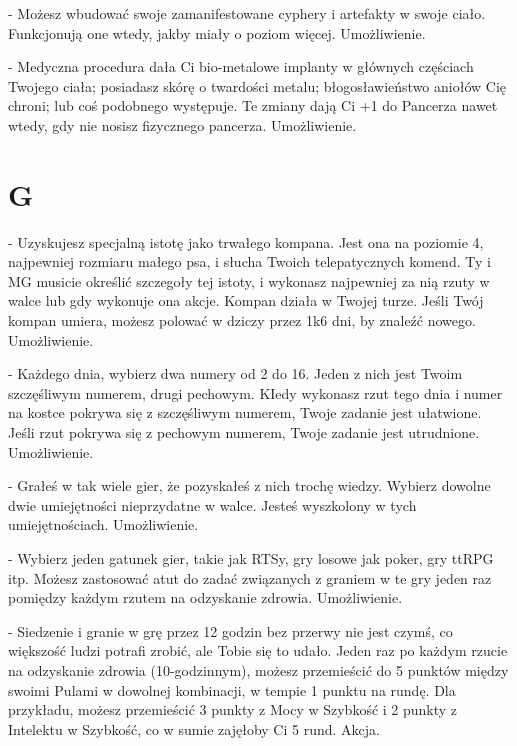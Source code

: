 { - Możesz wbudować swoje zamanifestowane cyphery i artefakty w swoje ciało. Funkcjonują one wtedy, jakby miały o poziom więcej. Umożliwienie.

 - Medyczna procedura dała Ci bio-metalowe implanty w głównych częściach Twojego ciała; posiadasz skórę o twardości metalu; błogosławieństwo aniołów Cię chroni; lub coś podobnego występuje. Te zmiany dają Ci +1 do Pancerza nawet wtedy, gdy nie nosisz fizycznego pancerza. Umożliwienie. 

\section{G}

 - Uzyskujesz specjalną istotę jako trwałego kompana. Jest ona na poziomie 4, najpewniej rozmiaru małego psa, i słucha Twoich telepatycznych komend. Ty i MG musicie określić szczegoły tej istoty, i wykonasz najpewniej za nią rzuty w walce lub gdy wykonuje ona akcje. Kompan działa w Twojej turze. Jeśli Twój kompan umiera, możesz polować w dziczy przez 1k6 dni, by znaleźć nowego. Umożliwienie.

 - Każdego dnia, wybierz dwa numery od 2 do 16. Jeden z nich jest Twoim szczęśliwym numerem, drugi pechowym. KIedy wykonasz rzut tego dnia i numer na kostce pokrywa się z szczęśliwym numerem, Twoje zadanie jest ułatwione. Jeśli rzut pokrywa się z  pechowym numerem, Twoje zadanie jest utrudnione. Umożliwienie.

 - Grałeś w tak wiele gier, że pozyskałeś z nich trochę wiedzy. Wybierz dowolne dwie umiejętności nieprzydatne w walce. Jesteś wyszkolony w tych umiejętnościach. Umożliwienie.

 - Wybierz jeden gatunek gier, takie jak RTSy, gry losowe jak poker, gry ttRPG itp. Możesz zastosować atut do zadać związanych z graniem w te gry jeden raz pomiędzy każdym rzutem na odzyskanie zdrowia. Umożliwienie. 

 - Siedzenie i granie w grę przez 12 godzin bez przerwy nie jest czymś, co większość ludzi potrafi zrobić, ale Tobie się to udało. Jeden raz po każdym rzucie na odzyskanie zdrowia (10-godzinnym), możesz przemieścić do 5 punktów między swoimi Pulami w dowolnej kombinacji, w tempie 1 punktu na rundę. Dla przykładu, możesz przemieścić 3 punkty z Mocy w Szybkość i 2 punkty z Intelektu w Szybkość, co w sumie zajęłoby Ci 5 rund. Akcja.

}
